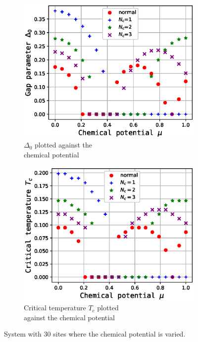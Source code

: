 \documentclass[11pt]{article}
\begin{document}
\begin{figure}[ht]
	\begin{subfigure}{0.5\textwidth}
	\begin{center}
		\includegraphics[width=\textwidth]{figures/delta0.eps}
	\caption{$\Delta_0$ plotted against the \\ chemical potential}
	\end{center}
	\end{subfigure}
	\begin{subfigure}{0.5\textwidth}
	\begin{center}
		\includegraphics[width=\textwidth]{figures/critical_temperature.eps}
	\caption{Critical temperature $T_c$ plotted \\ against the chemical potential}
	\end{center}
	\end{subfigure}
	\caption{System with 30 sites where the chemical potential is varied. }
	\label{fig:chemical-potential-study}
\end{figure}
\end{document}
